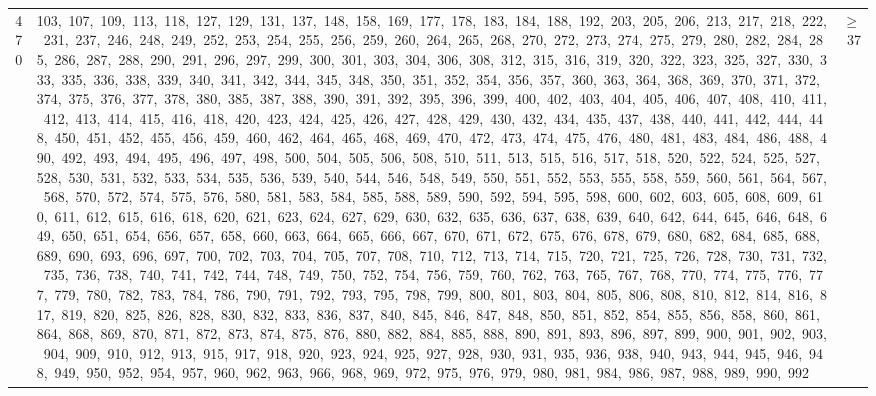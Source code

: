 \begin{longtable}{c|p{}|r}
470 & 103,\ 107,\ 109,\ 113,\ 118,\ 127,\ 129,\ 131,\ 137,\ 148,\ 158,\ 169,\ 177,\ 178,\ 183,\ 184,\ 188,\ 192,\ 203,\ 205,\ 206,\ 213,\ 217,\ 218,\ 222,\ 231,\ 237,\ 246,\ 248,\ 249,\ 252,\ 253,\ 254,\ 255,\ 256,\ 259,\ 260,\ 264,\ 265,\ 268,\ 270,\ 272,\ 273,\ 274,\ 275,\ 279,\ 280,\ 282,\ 284,\ 285,\ 286,\ 287,\ 288,\ 290,\ 291,\ 296,\ 297,\ 299,\ 300,\ 301,\ 303,\ 304,\ 306,\ 308,\ 312,\ 315,\ 316,\ 319,\ 320,\ 322,\ 323,\ 325,\ 327,\ 330,\ 333,\ 335,\ 336,\ 338,\ 339,\ 340,\ 341,\ 342,\ 344,\ 345,\ 348,\ 350,\ 351,\ 352,\ 354,\ 356,\ 357,\ 360,\ 363,\ 364,\ 368,\ 369,\ 370,\ 371,\ 372,\ 374,\ 375,\ 376,\ 377,\ 378,\ 380,\ 385,\ 387,\ 388,\ 390,\ 391,\ 392,\ 395,\ 396,\ 399,\ 400,\ 402,\ 403,\ 404,\ 405,\ 406,\ 407,\ 408,\ 410,\ 411,\ 412,\ 413,\ 414,\ 415,\ 416,\ 418,\ 420,\ 423,\ 424,\ 425,\ 426,\ 427,\ 428,\ 429,\ 430,\ 432,\ 434,\ 435,\ 437,\ 438,\ 440,\ 441,\ 442,\ 444,\ 448,\ 450,\ 451,\ 452,\ 455,\ 456,\ 459,\ 460,\ 462,\ 464,\ 465,\ 468,\ 469,\ 470,\ 472,\ 473,\ 474,\ 475,\ 476,\ 480,\ 481,\ 483,\ 484,\ 486,\ 488,\ 490,\ 492,\ 493,\ 494,\ 495,\ 496,\ 497,\ 498,\ 500,\ 504,\ 505,\ 506,\ 508,\ 510,\ 511,\ 513,\ 515,\ 516,\ 517,\ 518,\ 520,\ 522,\ 524,\ 525,\ 527,\ 528,\ 530,\ 531,\ 532,\ 533,\ 534,\ 535,\ 536,\ 539,\ 540,\ 544,\ 546,\ 548,\ 549,\ 550,\ 551,\ 552,\ 553,\ 555,\ 558,\ 559,\ 560,\ 561,\ 564,\ 567,\ 568,\ 570,\ 572,\ 574,\ 575,\ 576,\ 580,\ 581,\ 583,\ 584,\ 585,\ 588,\ 589,\ 590,\ 592,\ 594,\ 595,\ 598,\ 600,\ 602,\ 603,\ 605,\ 608,\ 609,\ 610,\ 611,\ 612,\ 615,\ 616,\ 618,\ 620,\ 621,\ 623,\ 624,\ 627,\ 629,\ 630,\ 632,\ 635,\ 636,\ 637,\ 638,\ 639,\ 640,\ 642,\ 644,\ 645,\ 646,\ 648,\ 649,\ 650,\ 651,\ 654,\ 656,\ 657,\ 658,\ 660,\ 663,\ 664,\ 665,\ 666,\ 667,\ 670,\ 671,\ 672,\ 675,\ 676,\ 678,\ 679,\ 680,\ 682,\ 684,\ 685,\ 688,\ 689,\ 690,\ 693,\ 696,\ 697,\ 700,\ 702,\ 703,\ 704,\ 705,\ 707,\ 708,\ 710,\ 712,\ 713,\ 714,\ 715,\ 720,\ 721,\ 725,\ 726,\ 728,\ 730,\ 731,\ 732,\ 735,\ 736,\ 738,\ 740,\ 741,\ 742,\ 744,\ 748,\ 749,\ 750,\ 752,\ 754,\ 756,\ 759,\ 760,\ 762,\ 763,\ 765,\ 767,\ 768,\ 770,\ 774,\ 775,\ 776,\ 777,\ 779,\ 780,\ 782,\ 783,\ 784,\ 786,\ 790,\ 791,\ 792,\ 793,\ 795,\ 798,\ 799,\ 800,\ 801,\ 803,\ 804,\ 805,\ 806,\ 808,\ 810,\ 812,\ 814,\ 816,\ 817,\ 819,\ 820,\ 825,\ 826,\ 828,\ 830,\ 832,\ 833,\ 836,\ 837,\ 840,\ 845,\ 846,\ 847,\ 848,\ 850,\ 851,\ 852,\ 854,\ 855,\ 856,\ 858,\ 860,\ 861,\ 864,\ 868,\ 869,\ 870,\ 871,\ 872,\ 873,\ 874,\ 875,\ 876,\ 880,\ 882,\ 884,\ 885,\ 888,\ 890,\ 891,\ 893,\ 896,\ 897,\ 899,\ 900,\ 901,\ 902,\ 903,\ 904,\ 909,\ 910,\ 912,\ 913,\ 915,\ 917,\ 918,\ 920,\ 923,\ 924,\ 925,\ 927,\ 928,\ 930,\ 931,\ 935,\ 936,\ 938,\ 940,\ 943,\ 944,\ 945,\ 946,\ 948,\ 949,\ 950,\ 952,\ 954,\ 957,\ 960,\ 962,\ 963,\ 966,\ 968,\ 969,\ 972,\ 975,\ 976,\ 979,\ 980,\ 981,\ 984,\ 986,\ 987,\ 988,\ 989,\ 990,\ 992 & $\ge$ 37 \\

\end{longtable}
